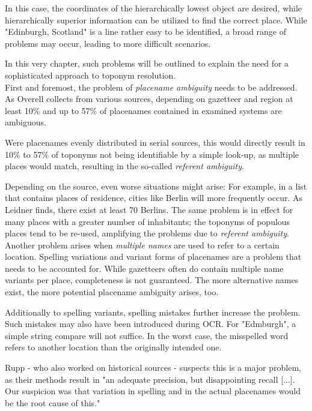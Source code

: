 \documentclass[11pt]{article}
\begin{document}
In this case, the coordinates of the hierarchically lowest object are desired, while hierarchically superior information can be utilized to find the correct place. While "Edinburgh, Scotland" is a line rather easy to be identified, a broad range of problems may occur, leading to more difficult scenarios.

In this very chapter, such problems will be outlined to explain the need for a sophisticated approach to toponym resolution.\\

First and foremost, the problem of \emph{placename ambiguity} needs to be addressed. As Overell collects from various sources, depending on gazetteer and region at least 10\% and up to 57\% of placenames contained in examined systems are ambiguous. \cite{overell11}

Were placenames evenly distributed in serial sources, this would directly result in 10\% to 57\% of toponyms not being identifiable by a simple look-up, as multiple places would match, resulting in the so-called \emph{referent ambiguity}\cite{overell11}\cite{wacholder97}.

Depending on the source, even worse situations might arise: For example, in a list that contains places of residence, cities like Berlin will more frequently occur. As Leidner finds, there exist at least 70 Berlins. \cite[p. 25]{leidner07} The same problem is in effect for many places with a greater number of inhabitants; the toponyms of populous places tend to be re-used, amplifying the problems due to \emph{referent ambiguity}.\\

Another problem arises when \emph{multiple names} are used to refer to a certain location. Spelling variations and variant forms of placenames are a problem that needs to be accounted for. \cite{rupp13} While gazetteers often do contain multiple name variants per place, completeness is not guaranteed. The more alternative names exist, the more potential placename ambiguity arises, too.

Additionally to spelling variants, spelling mistakes further increase the problem. Such mistakes may also have been introduced during OCR. For "Edmburgh", a simple string compare will not suffice. In the worst case, the misspelled word refers to another location than the originally intended one.

Rupp - who also worked on historical sources - suspects this is a major problem, as their methods result in "an adequate precision, but disappointing recall [...]. Our suspicion was that variation in spelling and in the actual placenames would be the root cause of this." \cite[p. 61]{rupp13}\\
\end{document}
